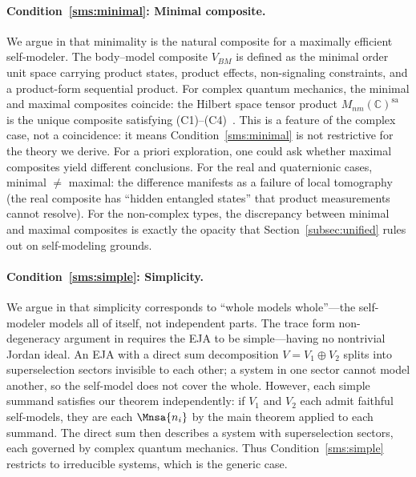 \paragraph{Condition~\ref{sms:minimal}: Minimal composite.}
We argue in  that minimality is the natural
composite for a maximally efficient self-modeler.
The body--model composite $V_{BM}$ is defined as the minimal order
unit space carrying product states, product effects, non-signaling
constraints, and a product-form sequential product.  For complex
quantum mechanics, the minimal and maximal composites coincide: the
Hilbert space tensor product $M_{nm}(\mathbb{C})^{\mathrm{sa}}$ is
the unique composite satisfying
(C1)--(C4)~\cite{Barnum2023}.  This is a
feature of the complex case, not a coincidence: it means Condition~\ref{sms:minimal}
is not restrictive for the theory we derive.
For a priori exploration, one could ask whether maximal composites
yield different conclusions.  For the real and quaternionic cases,
minimal $\neq$ maximal: the difference manifests as a failure of local
tomography (the real composite has ``hidden entangled states'' that
product measurements cannot resolve).  For the non-complex types, the discrepancy between minimal and
maximal composites is exactly the opacity that
Section~\ref{subsec:unified} rules out on self-modeling grounds.

\paragraph{Condition~\ref{sms:simple}: Simplicity.}
We argue in  that simplicity corresponds to
``whole models whole''---the self-modeler models all of itself, not
independent parts.
The trace form non-degeneracy argument in
 requires the EJA to be
simple---having no nontrivial Jordan ideal.  An EJA with a direct sum
decomposition $V = V_{1} \oplus V_{2}$ splits into superselection
sectors invisible to each other; a system in one sector cannot model
another, so the self-model does not cover the whole.  However, each simple
summand satisfies our theorem independently: if $V_{1}$ and $V_{2}$
each admit faithful self-models, they are each $\Mnsa{n_{i}}$ by the
main theorem applied to each summand.  The direct sum then describes a
system with superselection sectors, each governed by complex quantum
mechanics.  Thus Condition~\ref{sms:simple} restricts to irreducible
systems, which is the generic case.


